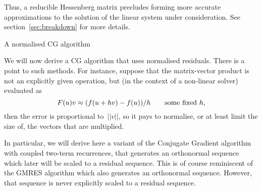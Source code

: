 \documentclass[11pt]{artikel3}
\begin{document}
\begin{Outline}
Thus, a reducible Hessenberg matrix
precludes forming more accurate approximations to 
the solution of the linear system under consideration.
See section~\ref{sec:breakdown} for more details.

 {A normalised CG algorithm}

We will now derive a CG algorithm that uses normalised residuals.
There is a point to such methods.
For instance, suppose that the matrix-vector product is not an 
explicitly given operation, but (in the context of a non-linear
solver) evaluated as
\[ F(u)v \approx (f(u+hv)-f(u))/h\qquad\hbox{some fixed $h$},\]
then the error is proportional to~$||v||$, so it pays to
normalise, or at least limit the size of, the vectors
that are multiplied.

In particular, we will derive here a variant of the 
Conjugate Gradient algorithm
with coupled two-term recurrences, that generates an orthonormal sequence
which later will be scaled to a residual sequence. 
This is of course reminiscent of the GMRES algorithm which also generates
an orthonormal sequence. However, that sequence is never explicitly
scaled to a residual sequence.


\end{Outline}
\end{document}
